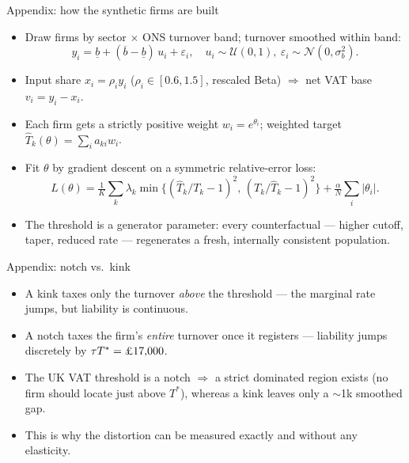 \documentclass[aspectratio=169]{beamer}
\newcommand{\back}[1]{\hfill{\footnotesize\hyperlink{#1}{\beamergotobutton{back}}}}
\renewcommand{\pounds}{\ifmmode\text{\textsterling}\else\textsterling\fi}
\begin{document}
\appendix

\begin{frame}{Appendix: how the synthetic firms are built}
  \hypertarget{slide:generation}{}
  \footnotesize
  \begin{itemize}\itemsep0.25cm
    \item Draw firms by sector $\times$ ONS turnover band; turnover smoothed within band:
      \[ y_i = \underline{b} + (\overline{b}-\underline{b})\,u_i + \varepsilon_i,
         \quad u_i\sim\mathcal{U}(0,1),\ \varepsilon_i\sim\mathcal{N}(0,\sigma_b^2). \]
    \item Input share $x_i=\rho_i y_i$ ($\rho_i\in[0.6,1.5]$, rescaled Beta) $\Rightarrow$
      net VAT base \alert{$v_i = y_i - x_i$}.
    \item Each firm gets a strictly positive weight \alert{$w_i = e^{\theta_i}$};
      weighted target $\widehat{T}_k(\theta)=\sum_i a_{ki}w_i$.
    \item Fit $\theta$ by \alert{gradient descent} on a symmetric relative-error loss:
      \[ L(\theta)=\tfrac{1}{K}\textstyle\sum_k \lambda_k
         \min\!\big\{(\widehat{T}_k/T_k-1)^2,\,(T_k/\widehat{T}_k-1)^2\big\}
         + \tfrac{\alpha}{N}\sum_i|\theta_i|. \]
    \item \alert{The threshold is a generator parameter}: every counterfactual ---
      higher cutoff, taper, reduced rate --- regenerates a fresh, internally
      consistent population.
  \end{itemize}
  \back{slide:data}
\end{frame}

\begin{frame}{Appendix: notch vs.\ kink}
  \hypertarget{slide:notch_def}{}
  \begin{itemize}\itemsep0.35cm
    \item A \alert{kink} taxes only the turnover \emph{above} the threshold ---
      the marginal rate jumps, but liability is continuous.
    \item A \alert{notch} taxes the firm's \emph{entire} turnover once it
      registers --- liability jumps discretely by $\tau T^{*}=\pounds17{,}000$.
    \item The UK VAT threshold is a notch $\Rightarrow$ a strict
      \alert{dominated region} exists (no firm should locate just above $T^{*}$),
      whereas a kink leaves only a $\sim$\pounds1k smoothed gap.
    \item This is why the distortion can be measured \alert{exactly and without
      any elasticity}.
  \end{itemize}
  \back{slide:motivation}
\end{frame}
\end{document}
